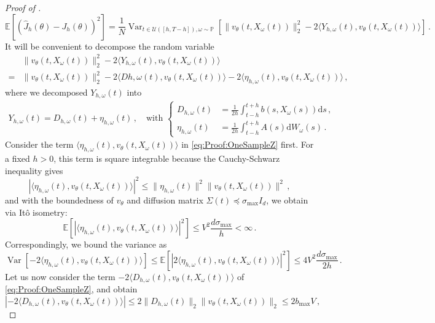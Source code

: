 \documentclass[oneside,11pt]{article}
\theoremstyle{remark}
\begin{document}
\begin{proof}[Proof of ]
\[
\mathbb{E}\left[\left(\widehat{J}_h(\theta) - J_h(\theta)\right)^2\right] = \frac{1}{N}\operatorname{Var}_{t \in \mathcal{U}([h, T - h]), \omega \sim \mathbb{P}}\left[\|v_{\theta}(t, X_{\omega}(t))\|_2^2 - 2\langle Y_{h,\omega}(t), v_{\theta}(t, X_{\omega}(t))\rangle\right]\,.
\]
It will be convenient to decompose the random variable
\begin{align}
&\|v_{\theta}(t, X_{\omega}(t))\|_2^2 - 2 \langle Y_{h,\omega}(t), v_{\theta}(t, X_{\omega}(t))\rangle \nonumber\\
= &\|v_{\theta}(t, X_{\omega}(t))\|_2^2 - 2\langle D{h,\omega}(t), v_{\theta}(t, X_{\omega}(t))\rangle - 2\langle \eta_{h,\omega}(t), v_{\theta}(t, X_{\omega}(t))\rangle\,,\label{eq:Proof:OneSampleZ}
\end{align}
where we decomposed $Y_{h,\omega}(t)$ into 
\begin{align*}
Y_{h,\omega}(t) = D_{h,\omega}(t) + \eta_{h,\omega}(t)\,,\quad  \text{with } \begin{cases} D_{h,\omega}(t) &= \frac{1}{2h}\int_{t - h}^{t + h} b(s, X_{\omega}(s))\mathrm ds\,, \\\eta_{h,\omega}(t) &= \frac{1}{2h} \int_{t - h}^{t + h} A(s) \mathrm dW_\omega(s)\,.
\end{cases}
\end{align*}
Consider the term $\langle \eta_{h,\omega}(t), v_{\theta}(t, X_{\omega}(t))\rangle$ in \eqref{eq:Proof:OneSampleZ} first. For a fixed $h > 0$, this term is square integrable because the Cauchy-Schwarz inequality gives
\[
|\langle\eta_{h,\omega}(t), v_{\theta}(t, X_{\omega}(t))\rangle|^2 \leq \|\eta_{h,\omega}(t)\|^2 \|v_{\theta}(t, X_{\omega}(t))\|^2\,,
\]
and with the boundedness of $v_\theta$ and diffusion matrix $\Sigma(t) \preceq \sigma_{\max} I_d$, we obtain via It{\^o} isometry:
\[
\mathbb{E}[|\langle\eta_{h,\omega}(t), v_{\theta}(t, X_{\omega}(t))\rangle|^2] \leq V^2 \frac{d \sigma_{\text{max}}}{h} < \infty\,.
\]
Correspondingly, we bound the variance as 
\begin{equation}\label{eq:Proof:Var1}
\operatorname{Var}[-2\langle\eta_{h,\omega}(t), v_{\theta}(t, X_{\omega}(t))\rangle] \leq \mathbb{E}[|2\langle\eta_{h,\omega}(t), v_{\theta}(t, X_{\omega}(t))\rangle|^2] \leq 4V^2 \frac{d \sigma_{\text{max}}}{2h}\,.
\end{equation}
Let us now consider the term $- 2\langle D_{h,\omega}(t), v_{\theta}(t, X_{\omega}(t))\rangle$ of \eqref{eq:Proof:OneSampleZ}, and obtain
\[
|- 2\langle D_{h,\omega}(t), v_{\theta}(t, X_{\omega}(t))\rangle| \leq 2 \|D_{h, \omega}(t)\|_2 \|v_{\theta}(t, X_{\omega}(t))\|_2 \leq 2b_{\text{max}} V\,,
\]
\end{proof}
\end{document}
